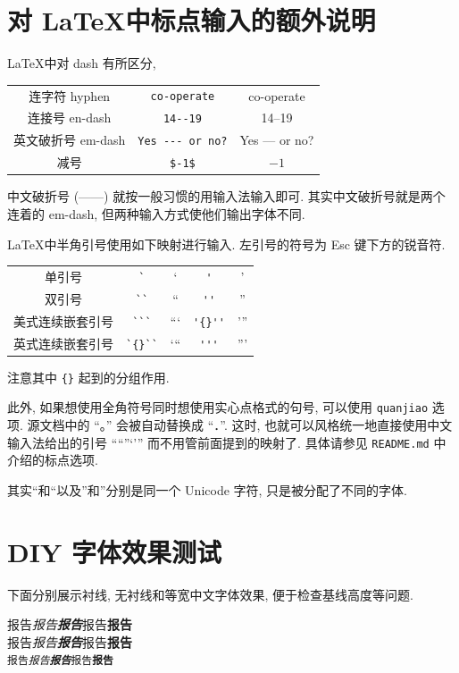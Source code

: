 \documentclass[font=notofandol]{mpltx}
\newcommand{\note}[1]{{\color{gray}#1}}
\begin{document}
\section{对 \LaTeX 中标点输入的额外说明}
\LaTeX 中对 dash 有所区分,
\begin{center}
    \begin{tabular}{c@{\quad}c@{\ $\rightarrow$\ }c}
        连字符 hyphen    & \verb|co-operate|     & co-operate \\
        连接号 en-dash   & \verb|14--19|         & 14--19 \\
        英文破折号 em-dash & \verb|Yes --- or no?| & Yes --- or no? \\
        减号            & \verb|$-1$|           & $-1$ \\
    \end{tabular}
\end{center}
中文破折号 (——) 就按一般习惯的用输入法输入即可.
\note{其实中文破折号就是两个连着的 em-dash, 但两种输入方式使他们输出字体不同.}

\LaTeX 中半角引号使用如下映射进行输入.
左引号的符号为 \textsf{Esc} 键下方的锐音符.
\begin{center}
    \begin{tabular}{c@{\quad}c@{\ $\rightarrow$\ }c@{\quad}c@{\ $\rightarrow$\ }c}
        单引号      & \verb|`|     & `     & \verb|'|     & ' \\
        双引号      & \verb|``|    & ``    & \verb|''|    & '' \\
        美式连续嵌套引号 & \verb|```|   & ```   & \verb|'{}''| & '{}'' \\
        英式连续嵌套引号 & \verb|`{}``| & `{}`` & \verb|'''|   & ''' \\
    \end{tabular}
\end{center}
注意其中 \texttt{\{\}} 起到的分组作用.

此外, 如果想使用全角符号同时想使用实心点格式的句号, 可以使用 \texttt{quanjiao} 选项.
源文档中的 ``。'' 会被自动替换成 ``．''.
这时, 也就可以风格统一地直接使用中文输入法给出的引号 ``“”‘’'' 而不用管前面提到的映射了.
具体请参见 \texttt{README.md} 中介绍的标点选项.

\note{其实“和``以及”和''分别是同一个 Unicode 字符, 只是被分配了不同的字体.}

\section{DIY 字体效果测试}

\newcommand{\testword}{报告}
\newcommand{\andbold}{\testword{}\textbf{\testword{}}}
\newcommand{\testline}{\testword{}\emph{\andbold{}}\andbold{}}

下面分别展示衬线, 无衬线和等宽中文字体效果, 便于检查基线高度等问题.
\begin{center}
    \textrm{\testline}\\
    \textsf{\testline}\\
    \texttt{\testline}
\end{center}
\end{document}
